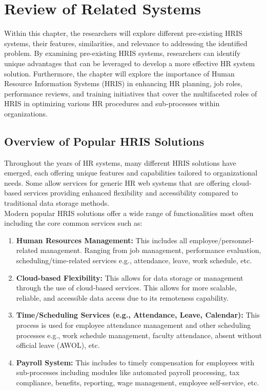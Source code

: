 
\section{Review of Related Systems}
    Within this chapter, the researchers will explore different pre-existing HRIS systems, their features, similarities, and relevance to addressing the identified problem. By examining pre-existing HRIS systems, researchers can identify unique advantages that can be leveraged to develop a more effective HR system solution. Furthermore, the chapter will explore the importance of Human Resource Information Systems (HRIS) in enhancing HR planning, job roles, performance reviews, and training initiatives that cover the multifaceted roles of HRIS in optimizing various HR procedures and sub-processes within organizations.
    \\
    
    \subsection{Overview of Popular HRIS Solutions}
    Throughout the years of HR systems, many different HRIS solutions have emerged, each offering unique features and capabilities tailored to organizational needs. Some allow services for generic HR web systems that are offering cloud-based services providing enhanced flexibility and accessibility compared to traditional data storage methods.
    \\

    Modern popular HRIS solutions offer a wide range of functionalities most often including the core common services such as:

    \begin{enumerate}
        \item \textbf{Human Resources Management:} This includes all employee/personnel-related management. Ranging from job management, performance evaluation, scheduling/time-related services e.g., attendance, leave, work schedule, etc.
        \item \textbf{Cloud-based Flexibility:} This allows for data storage or management through the use of cloud-based services. This allows for more scalable, reliable, and accessible data access due to its remoteness capability.
        \item \textbf{Time/Scheduling Services (e.g., Attendance, Leave, Calendar):} This process is used for employee attendance management and other scheduling processes e.g., work schedule management, faculty attendance, absent without official leave (AWOL), etc.
        \item \textbf{Payroll System:} This includes to timely compensation for employees with sub-processes including modules like automated payroll processing, tax compliance, benefits, reporting, wage management, employee self-service, etc.
    \end{enumerate}

